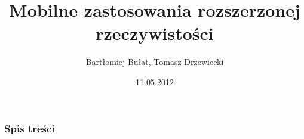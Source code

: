 \documentclass{beamer}
\title[Mobilne zastosowania rozszerzonej rzeczywistości]{Mobilne zastosowania rozszerzonej rzeczywistości}
\author[B. Bułat, T. Drzewiecki]{Bartłomiej Bułat, Tomasz Drzewiecki}
\date[2012]{11.05.2012}
\institute[AGH]
{Wydział EAIiE\\ 
Katedra Automatyki
}
\begin{document}
{
 \begin{frame}
   \titlepage
 \end{frame}
}


\begin{frame}
  \frametitle{Spis treści}
  \tableofcontents[hidesubsections]
\end{frame}

\newcommand{\nextoc}{%
  \begin{frame}\frametitle{Spis treści}\tableofcontents[hidesubsections]\end{frame}}







\end{document}
